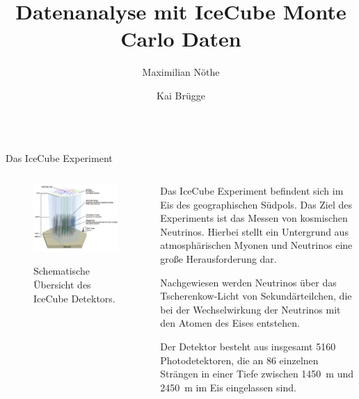 \documentclass[t]{beamer}
\title{Datenanalyse mit IceCube Monte Carlo Daten}
\author{Maximilian Nöthe \and Kai Brügge}
\institute{%
  \texttt{[image: tudo.pdf]}%
}
\begin{document}
  \begin{columns}[onlytextwidth]%
    \begin{column}{0.5\textwidth}%
      \begin{block}{Das IceCube Experiment}%
        \begin{columns}[onlytextwidth]%
          \begin{column}{0.48\textwidth}%
            \begin{figure}
              \includegraphics[width=\linewidth]{images/icecube_schema.jpg}\\
              \caption{Schematische Übersicht des IceCube Detektors.}
            \end{figure}
          \end{column}\hfill
          \begin{column}{0.48\textwidth}%
            \justifying
            Das IceCube Experiment befindent sich im Eis des geographischen Südpols.
            Das Ziel des Experiments ist das Messen von kosmischen Neutrinos.
            Hierbei stellt ein Untergrund aus atmosphärischen Myonen und Neutrinos eine
            große Herausforderung dar.

            Nachgewiesen werden Neutrinos über das Tscherenkow-Licht von Sekundärteilchen,
            die bei der Wechselwirkung der Neutrinos mit den Atomen des Eises entstehen.

            Der Detektor besteht aus insgesamt \num{5160} Photodetektoren,
            die an \num{86} einzelnen Strängen in einer Tiefe zwischen
            \SI{1450}{\meter} und \SI{2450}{\meter} im Eis eingelassen sind.


\end{column}
\end{columns}
\end{block}
\end{column}
\end{columns}
\end{document}
